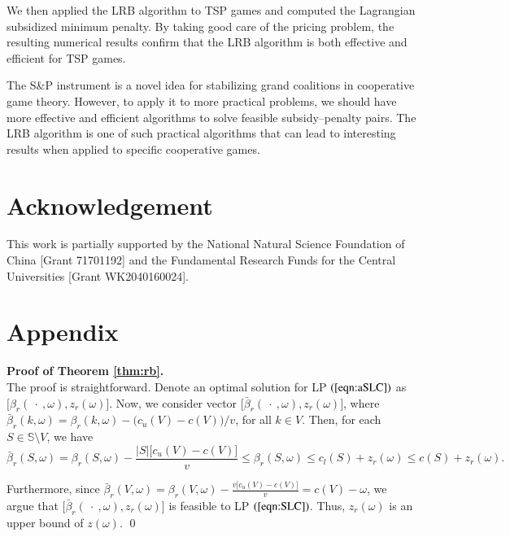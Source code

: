 \documentclass[authoryear,review,12pt]{elsarticle}
\begin{document}
We then applied the LRB algorithm to TSP games and computed the Lagrangian subsidized minimum penalty.
By taking good care of the pricing problem, the resulting numerical results confirm that the LRB algorithm is both effective and efficient for TSP games.

The S\&P instrument is a novel idea for stabilizing grand coalitions in cooperative game theory.
However, to apply it to more practical problems, we should have more effective and efficient algorithms to solve feasible subsidy--penalty pairs.
The LRB algorithm is one of such practical algorithms that can lead to interesting results when applied to specific cooperative games.


\section*{Acknowledgement}
This work is partially supported by the National Natural Science Foundation of China [Grant 71701192] and the Fundamental Research Funds for the Central Universities [Grant WK2040160024].





\section*{Appendix}
\noindent \textbf{Proof of Theorem \ref{thm:rb}.}\\
The proof is straightforward.
Denote an optimal solution for LP $(\ref{eqn:aSLC})$ as $\big[\beta_r(\ \cdot \ ,\omega),z_r(\omega)\big]$. Now, we consider vector $\big[\bar{\beta}_r(\ \cdot \ ,\omega),z_r(\omega)\big]$, where $\bar{\beta}_r(k,\omega) = \beta_r(k,\omega) - \big(c_u(V)-c(V)\big)/v$, for all $k \in V$. Then, for each $S \in \mathbb{S} \setminus V$, we have
\begin{equation*}
\bar{\beta}_r(S,\omega)  = \beta_r(S,\omega) - \frac{|S|\big[c_u(V)-c(V)\big]}{v} \leq \beta_r(S,\omega) \leq c_l(S)+ z_r(\omega) \leq c(S) + z_r(\omega).
\end{equation*}

Furthermore, since $\bar{\beta}_r(V,\omega) = \beta_r(V,\omega) - \frac{v\big[c_u(V)-c(V)\big]}{v} = c(V)-\omega$, we argue that $\big[ \bar{\beta}_r(\ \cdot \ ,\omega),z_r(\omega) \big]$ is feasible to LP $(\ref{eqn:SLC})$.
Thus, $z_r(\omega)$ is an upper bound of $z(\omega)$.
\qed
\end{document}

